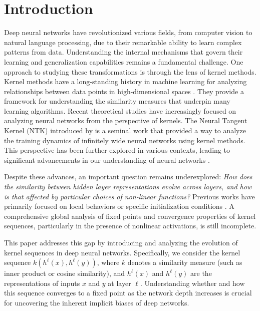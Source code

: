 \documentclass[twoside]{article}
\theoremstyle{definition}
\begin{document}
\section{Introduction}
Deep neural networks have revolutionized various fields, from computer vision to natural language processing, due to their remarkable ability to learn complex patterns from data. Understanding the internal mechanisms that govern their learning and generalization capabilities remains a fundamental challenge. 
One approach to studying these transformations is through the lens of kernel methods. Kernel methods have a long-standing history in machine learning for analyzing relationships between data points in high-dimensional spaces \citep{scholkopf2002learning, smola2004tutorial}. They provide a framework for understanding the similarity measures that underpin many learning algorithms. Recent theoretical studies have increasingly focused on analyzing neural networks from the perspective of kernels. The Neural Tangent Kernel (NTK) introduced by \citet{jacot2018neural} is a seminal work that provided a way to analyze the training dynamics of infinitely wide neural networks using kernel methods. This perspective has been further explored in various contexts, leading to significant advancements in our understanding of neural networks \citep{lee2019wide, arora2019exact, yang2019scaling}.

Despite these advances, an important question remains underexplored: \emph{How does the similarity between hidden layer representations evolve across layers, and how is that affected by particular choices of non-linear functions?} Previous works have primarily focused on local behaviors or specific initialization conditions \citep{saxe2013exact, schoenholz2016deep, pennington2017resurrecting}. A comprehensive global analysis of fixed points and convergence properties of kernel sequences, particularly in the presence of nonlinear activations, is still incomplete.

This paper addresses this gap by introducing and analyzing the evolution of kernel sequences in deep neural networks. Specifically, we consider the kernel sequence $k(h^\ell(x), h^\ell(y))$, where $k$ denotes a similarity measure (such as inner product or cosine similarity), and $h^\ell(x)$ and $h^\ell(y)$ are the representations of inputs $x$ and $y$ at layer $\ell$. Understanding whether and how this sequence converges to a fixed point as the network depth increases is crucial for uncovering the inherent implicit biases of deep networks.
\end{document}
